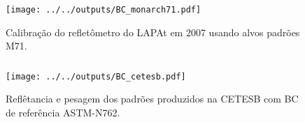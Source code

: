 %    

%    


%      
%      

%      
%      


\begin{frame}
  \frametitle{}
  \begin{figure}[H]
    \centering
    \texttt{[image: ../../outputs/BC\_monarch71.pdf]}
    \caption{Calibração do refletômetro do LAPAt em 2007 usando alvos padrões M71.
           \label{fig:monarch71}}
  \end{figure}
\end{frame}


\begin{frame}
  \frametitle{}
  \begin{figure}[H]
  	\centering
  	\texttt{[image: ../../outputs/BC\_cetesb.pdf]}
  	\caption{Reflêtancia e pesagem dos padrões produzidos na CETESB com BC 
                   de referência ASTM-N762. \label{fig:bc_cetesb}}
  \end{figure}
\end{frame}


